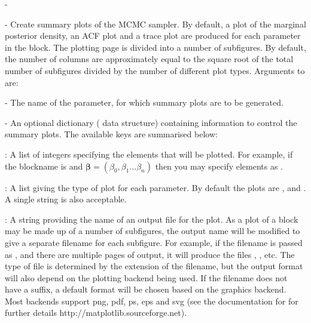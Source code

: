 -\documentclass[article]{jss}
\begin{document}
\begin{description}
\begin{description}
  \item {} - Create summary plots of
    the MCMC sampler.  By default, a plot of the marginal posterior
    density, an ACF plot and a trace plot are produced for each
    parameter in the block. The plotting page is divided into a number
    of subfigures. By default, the number of columns are approximately
    equal to the square root of the total number of subfigures divided
    by the number of different plot types. Arguments to  are:

  \begin{description}
  \item {} - The name of the parameter, for which summary
    plots are to be generated.
  \item {} - An optional dictionary
    ( data structure) containing information to
    control the summary plots.  The available keys are summarised
    below:

    \begin{description}
    \item {}: A list of integers specifying the elements
      that will be plotted. For example, if the blockname is
       and
      $\bm{\beta}=(\beta_{0},\beta_{1}\ldots\beta_{n})$ then you may
      specify elements as .
    \item {}: A list giving the type of plot for each
      parameter. By default the plots are ,
       and . A single string is also
      acceptable.
    \item {}: A string providing the name of an output
      file for the plot.  As a plot of a block may be made up of a
      number of subfigures, the output name will be modified to give a
      separate filename for each subfigure. For example, if the
      filename is passed as , and there are multiple
      pages of output, it will produce the files ,
      , etc.  The type of file is determined by the
      extension of the filename, but the output format will also
      depend on the plotting backend being used.  If the filename does
      not have a suffix, a default format will be chosen based on the
      graphics backend. Most backends support png, pdf, ps, eps and
      svg (see the documentation for  for further
      details http://matplotlib.sourceforge.net).


\end{description}
\end{description}
\end{description}
\end{description}
\end{document}
